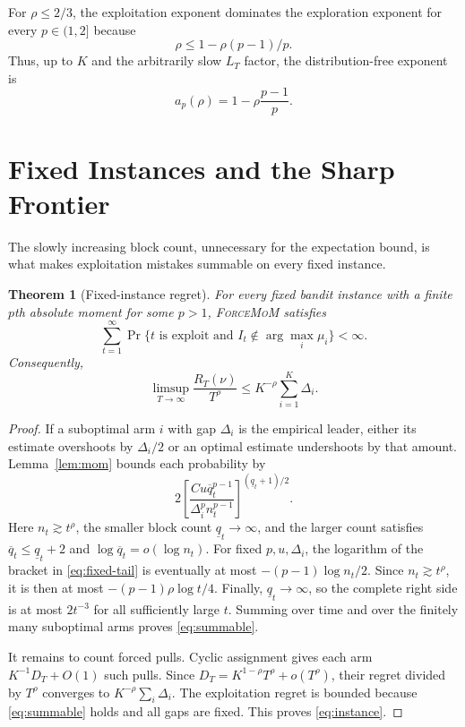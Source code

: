 \documentclass[twoside]{article}
\newtheorem{theorem}{Theorem}
\newcommand{\FM}{\textnormal{\textsc{ForceMoM}}}
\begin{document}
For $\rho\leq2/3$, the exploitation exponent dominates the exploration
exponent for every $p\in(1,2]$ because
\[
 \rho\leq1-\rho(p-1)/p.
\]
Thus, up to $K$ and the arbitrarily slow $L_T$ factor, the
distribution-free exponent is
\begin{equation}
 a_p(\rho)=1-\rho\frac{p-1}{p}.
 \label{eq:free-exponent}
\end{equation}

\section{Fixed Instances and the Sharp Frontier}
\label{sec:frontier}

The slowly increasing block count, unnecessary for the expectation bound,
is what makes exploitation mistakes summable on every fixed instance.

\begin{theorem}[Fixed-instance regret]
\label{thm:instance}
For every fixed bandit instance with a finite $p$th absolute moment for some
$p>1$, \FM{} satisfies
\begin{equation}
 \sum_{t=1}^\infty
 \Pr\{t\text{ is exploit and }I_t\notin\arg\max_i\mu_i\}<\infty.
 \label{eq:summable}
\end{equation}
Consequently,
\begin{equation}
 \limsup_{T\to\infty}\frac{R_T(\nu)}{T^\rho}
 \leq K^{-\rho}\sum_{i=1}^K\Delta_i.
 \label{eq:instance}
\end{equation}
\end{theorem}

\begin{proof}
If a suboptimal arm $i$ with gap $\Delta_i$ is the empirical leader, either
its estimate overshoots by $\Delta_i/2$ or an optimal estimate undershoots
by that amount. Lemma~\ref{lem:mom} bounds each probability by
\begin{equation}
 2\left[
 \frac{C u \overline q_t^{p-1}}
 {\Delta_i^p n_t^{p-1}}
 \right]^{(\underline q_t+1)/2}.
 \label{eq:fixed-tail}
\end{equation}
Here $n_t\gtrsim t^\rho$, the smaller block count
$\underline q_t\to\infty$, and the larger count satisfies
$\overline q_t\leq\underline q_t+2$ and
$\log\overline q_t=o(\log n_t)$. For fixed $p,u,\Delta_i$, the logarithm of
the bracket in \eqref{eq:fixed-tail} is eventually at most
$-(p-1)\log n_t/2$. Since $n_t\gtrsim t^\rho$, it is then at most
$-(p-1)\rho\log t/4$. Finally, $\underline q_t\to\infty$, so the complete
right side is at most $2t^{-3}$ for all sufficiently large $t$. Summing over
time and over the finitely many suboptimal arms proves \eqref{eq:summable}.

It remains to count forced pulls. Cyclic assignment gives each arm
$K^{-1}D_T+O(1)$ such pulls. Since
$D_T=K^{1-\rho}T^\rho+o(T^\rho)$, their regret divided by $T^\rho$ converges
to $K^{-\rho}\sum_i\Delta_i$. The exploitation regret is bounded because
\eqref{eq:summable} holds and all gaps are fixed. This proves
\eqref{eq:instance}.
\end{proof}
\end{document}
